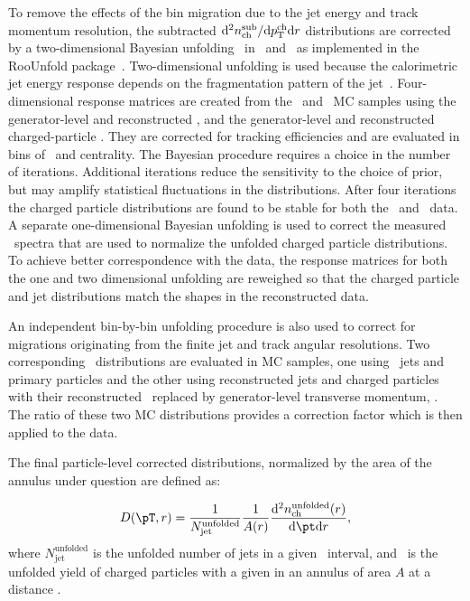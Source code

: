 
To remove the effects of the bin migration due to the jet energy and track momentum resolution, the subtracted $\mathrm{d}^2 \mbox{$n_{\mathrm{ch}}^{\mathrm{sub}}$} /\mathrm{d}\mbox{$p_{\mathrm{T}}^{\mathrm{ch}}$} \mathrm{d} r$ distributions are corrected by a two-dimensional Bayesian unfolding~\cite{DAgostini:1994zf}
in \pttrk\ and \ptjet\ as implemented in the RooUnfold package~\cite{Adye:2011gm}.  
Two-dimensional unfolding is used because the calorimetric jet energy response depends on the fragmentation pattern of the jet~\cite{Aad:2011he}.
Four-dimensional response matrices are created from the \pp\ and \pbpb\ MC samples using the generator-level and reconstructed \ptjet, and the generator-level and reconstructed charged-particle \pttrk. They are corrected for tracking efficiencies and are evaluated in bins of \rvar\ and centrality. The Bayesian procedure requires a choice in the number of iterations.
Additional iterations reduce the sensitivity to the choice of prior, but may
amplify statistical fluctuations in the distributions.
After four iterations the 
charged particle distributions are found to be stable for both the \PbPb\ and \pp\ data.
A separate one-dimensional Bayesian unfolding is used to correct the measured \ptjet\ spectra that are used to normalize the unfolded charged particle distributions.
To achieve better correspondence with the data, the response matrices for both the one and two dimensional unfolding are reweighed so that the charged particle and jet distributions match the shapes in the reconstructed data.

An independent bin-by-bin unfolding procedure is also used to correct for migrations originating from the finite jet and track angular resolutions. Two corresponding \Dptr\ distributions are evaluated in MC samples, one using \pythia\ jets and primary particles and the other using reconstructed jets and charged particles with their reconstructed \pt\ replaced by generator-level transverse momentum, \pTtrue. The ratio of these two MC distributions provides a correction factor which is then applied to the data. 

The final particle-level corrected distributions, normalized by the area of the annulus under question are defined as:

\begin{align*}
   \Dptr = \frac{1}{N_\mathrm{jet}^\mathrm{unfolded}} \frac{1}{A(r)} \frac{\fd^2 \nchunf(r)}{\fd \pt \fd r},
 \end{align*}
where $N_\mathrm{jet}^\mathrm{unfolded}$ is the unfolded number of jets in a given \ptjet\ interval, and \nchunf\  is the unfolded yield of charged particles with a given \pt in an annulus of area $A$ at a distance \rvar.

